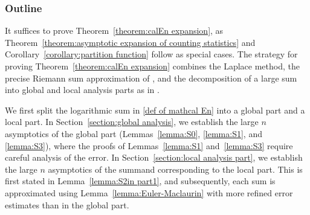 \documentclass[reqno]{amsart}
\newcommand{\1}{\mathds{1}}
\numberwithin{equation}{section}
\theoremstyle{definition}
\begin{document}
\subsubsection*{Outline}
It suffices to prove Theorem~\ref{theorem:calEn expansion}, as Theorem~\ref{theorem:asymptotic expansion of counting statistics} and Corollary~\ref{corollary:partition function} follow as special cases.
The strategy for proving Theorem~\ref{theorem:calEn expansion} combines the Laplace method, the precise Riemann sum approximation of \cite{C2021}, and the decomposition of a large sum into global and local analysis parts as in \cite{BC2022}.

We first split the logarithmic sum in \eqref{def of mathcal En} into a global part and a local part. 
In Section~\ref{section:global analysis}, we establish the large $n$ asymptotics of the global part (Lemmas~\ref{lemma:S0}, \ref{lemma:S1}, and \ref{lemma:S3}), 
where the proofs of Lemmas~\ref{lemma:S1} and~\ref{lemma:S3} require careful analysis of the error. 
In Section~\ref{section:local analysis part}, we establish the large $n$ asymptotics of the summand corresponding to the local part. 
This is first stated in Lemma~\ref{lemma:S2in part1}, and subsequently, each sum is approximated using Lemma~\ref{lemma:Euler-Maclaurin} with more refined error estimates than in the global part.  

\end{document}
